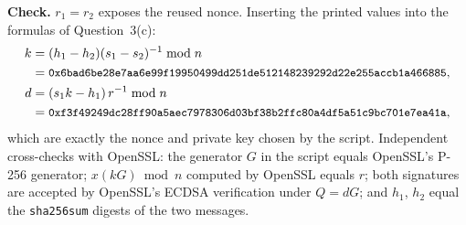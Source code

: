 \documentclass[11pt,a4paper]{article}
\begin{document}
\textbf{Check.} $r_1 = r_2$ exposes the reused nonce. Inserting the printed values into the formulas of Question~3(c):
\begin{align*}
k &= (h_1 - h_2)(s_1 - s_2)^{-1} \bmod n\\
  &= \text{\small\texttt{0x6bad6be28e7aa6e99f19950499dd251de512148239292d22e255accb1a466885}},\\
d &= (s_1 k - h_1)\, r^{-1} \bmod n\\
  &= \text{\small\texttt{0xf3f49249dc28ff90a5aec7978306d03bf38b2ffc80a4df5a51c9bc701e7ea41a}},
\end{align*}
which are exactly the nonce and private key chosen by the script. Independent cross-checks with OpenSSL: the
generator $G$ in the script equals OpenSSL's P-256 generator; $x(kG) \bmod n$ computed by OpenSSL equals $r$; both
signatures are accepted by OpenSSL's ECDSA verification under $Q = dG$; and $h_1$, $h_2$ equal the
\texttt{sha256sum} digests of the two messages.
\end{document}
